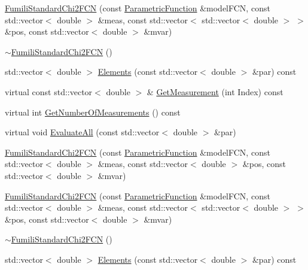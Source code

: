 \begin{DoxyCompactItemize}
\mbox{\hyperlink{classROOT_1_1Minuit2_1_1FumiliStandardChi2FCN_a9a18cdf86c47d62aed4298120a44a601}{Fumili\+Standard\+Chi2\+F\+CN}} (const \mbox{\hyperlink{classROOT_1_1Minuit2_1_1ParametricFunction}{Parametric\+Function}} \&model\+F\+CN, const std\+::vector$<$ double $>$ \&meas, const std\+::vector$<$ std\+::vector$<$ double $>$ $>$ \&pos, const std\+::vector$<$ double $>$ \&mvar)
\item 
\mbox{\hyperlink{classROOT_1_1Minuit2_1_1FumiliStandardChi2FCN_a74d68d4f8ee38aff21a0e5a4e7d4173b}{$\sim$\+Fumili\+Standard\+Chi2\+F\+CN}} ()
\item 
std\+::vector$<$ double $>$ \mbox{\hyperlink{classROOT_1_1Minuit2_1_1FumiliStandardChi2FCN_ab05d3fe2dcb9b1c56b6753debe5e0064}{Elements}} (const std\+::vector$<$ double $>$ \&par) const
\item 
virtual const std\+::vector$<$ double $>$ \& \mbox{\hyperlink{classROOT_1_1Minuit2_1_1FumiliStandardChi2FCN_a3bbc9a9cb77ce45aa764aa1f6e74349c}{Get\+Measurement}} (int Index) const
\item 
virtual int \mbox{\hyperlink{classROOT_1_1Minuit2_1_1FumiliStandardChi2FCN_a868b7c1aa7d2597db475ca99799c9131}{Get\+Number\+Of\+Measurements}} () const
\item 
virtual void \mbox{\hyperlink{classROOT_1_1Minuit2_1_1FumiliStandardChi2FCN_ace15dd1aad435e460c523bc37bff12a8}{Evaluate\+All}} (const std\+::vector$<$ double $>$ \&par)
\item 
\mbox{\hyperlink{classROOT_1_1Minuit2_1_1FumiliStandardChi2FCN_a1b86269a64b1368ac6d33de89f32674d}{Fumili\+Standard\+Chi2\+F\+CN}} (const \mbox{\hyperlink{classROOT_1_1Minuit2_1_1ParametricFunction}{Parametric\+Function}} \&model\+F\+CN, const std\+::vector$<$ double $>$ \&meas, const std\+::vector$<$ double $>$ \&pos, const std\+::vector$<$ double $>$ \&mvar)
\item 
\mbox{\hyperlink{classROOT_1_1Minuit2_1_1FumiliStandardChi2FCN_a9a18cdf86c47d62aed4298120a44a601}{Fumili\+Standard\+Chi2\+F\+CN}} (const \mbox{\hyperlink{classROOT_1_1Minuit2_1_1ParametricFunction}{Parametric\+Function}} \&model\+F\+CN, const std\+::vector$<$ double $>$ \&meas, const std\+::vector$<$ std\+::vector$<$ double $>$ $>$ \&pos, const std\+::vector$<$ double $>$ \&mvar)
\item 
\mbox{\hyperlink{classROOT_1_1Minuit2_1_1FumiliStandardChi2FCN_a74d68d4f8ee38aff21a0e5a4e7d4173b}{$\sim$\+Fumili\+Standard\+Chi2\+F\+CN}} ()
\item 
std\+::vector$<$ double $>$ \mbox{\hyperlink{classROOT_1_1Minuit2_1_1FumiliStandardChi2FCN_ab05d3fe2dcb9b1c56b6753debe5e0064}{Elements}} (const std\+::vector$<$ double $>$ \&par) const

\end{DoxyCompactItemize}
